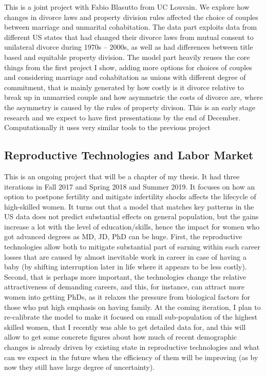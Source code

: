 \documentclass[12pt,letter]{article}
\begin{document}
This is a joint project with Fabio Blasutto from UC Louvain. We explore how changes in divorce laws and property division rules affected the choice of couples between marriage and unmarital cohabitation. The data part exploits data from different US states that had changed their divorce laws from mutual consent to unilateral divorce during 1970s -- 2000s, as well as had differences between title based and equitable property division. The model part heavily reuses the core things from the first project I show, adding more options for choices of couples and considering marriage and cohabitation as unions with different degree of commitment, that is mainly generated by how costly is it divorce relative to break up in unmarried couple and how asymmetric the costs of divorce are, where the asymmetry is caused by the rules of property divison. This is an early stage research and we expect to have first presentations by the end of December. Computationally it uses very similar tools to the previous project

\subsection*{Reproductive Technologies and Labor Market}
This is an ongoing project that will be a chapter of my thesis. It had three iterations in Fall 2017 and Spring 2018 and Summer 2019. It focuses on how an option to postpone fertility and mitigate infertility shocks affects the lifecycle of high-skilled women. It turns out that a model that matches key patterns in the US data does not predict substantial effects on general population, but the gains increase a lot with the level of education/skills, hence the impact for women who got advanced degrees as MD, JD, PhD can be huge. First, the reproductive technologies allow both to mitigate substantial part of earning within each career losses that are caused by almost inevitable work in career in case of having a baby (by shifting interruption later in life where it appears to be less costly). Second, that is perhaps more important, the technologies change the relative attractiveness of demanding careers, and this, for instance, can attract more women into getting PhDs, as it relaxes the pressure from biological factors for those who put high emphasis on having family. At the coming iteration, I plan to re-calibrate the model to make it focused on small sub-population of the highest skilled women, that I recently was able to get detailed data for, and this will allow to get some concrete figures about how much of recent demographic changes is already driven by  existing state in reproductive technologies and what can we expect in the future when the efficiency of them will be improving (as by now they still have large degree of uncertainty). 
\end{document}
